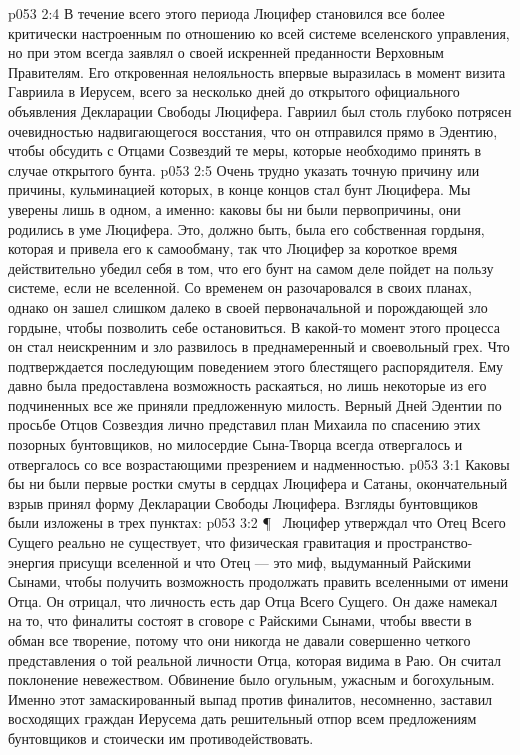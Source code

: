 \vs p053 2:4 В течение всего этого периода Люцифер становился все более критически настроенным по отношению ко всей системе вселенского управления, но при этом всегда заявлял о своей искренней преданности Верховным Правителям. Его откровенная нелояльность впервые выразилась в момент визита Гавриила в Иерусем, всего за несколько дней до открытого официального объявления Декларации Свободы Люцифера. Гавриил был столь глубоко потрясен очевидностью надвигающегося восстания, что он отправился прямо в Эдентию, чтобы обсудить с Отцами Созвездий те меры, которые необходимо принять в случае открытого бунта.
\vs p053 2:5 Очень трудно указать точную причину или причины, кульминацией которых, в конце концов стал бунт Люцифера. Мы уверены лишь в одном, а именно: каковы бы ни были первопричины, они родились в уме Люцифера. Это, должно быть, была его собственная гордыня, которая и привела его к самообману, так что Люцифер за короткое время действительно убедил себя в том, что его бунт на самом деле пойдет на пользу системе, если не вселенной. Со временем он разочаровался в своих планах, однако он зашел слишком далеко в своей первоначальной и порождающей зло гордыне, чтобы позволить себе остановиться. В какой\hyp{}то момент этого процесса он стал неискренним и зло развилось в преднамеренный и своевольный грех. Что подтверждается последующим поведением этого блестящего распорядителя. Ему давно была предоставлена возможность раскаяться, но лишь некоторые из его подчиненных все же приняли предложенную милость. Верный Дней Эдентии по просьбе Отцов Созвездия лично представил план Михаила по спасению этих позорных бунтовщиков, но милосердие Сына\hyp{}Творца всегда отвергалось и отвергалось со все возрастающими презрением и надменностью.
\vs p053 3:1 Каковы бы ни были первые ростки смуты в сердцах Люцифера и Сатаны, окончательный взрыв принял форму Декларации Свободы Люцифера. Взгляды бунтовщиков были изложены в трех пунктах:
\vs p053 3:2 \P\ \bibnobreakspace {} Люцифер утверждал что Отец Всего Сущего реально не существует, что физическая гравитация и пространство\hyp{}энергия присущи вселенной и что Отец --- это миф, выдуманный Райскими Сынами, чтобы получить возможность продолжать править вселенными от имени Отца. Он отрицал, что личность есть дар Отца Всего Сущего. Он даже намекал на то, что финалиты состоят в сговоре с Райскими Сынами, чтобы ввести в обман все творение, потому что они никогда не давали совершенно четкого представления о той реальной личности Отца, которая видима в Раю. Он считал поклонение невежеством. Обвинение было огульным, ужасным и богохульным. Именно этот замаскированный выпад против финалитов, несомненно, заставил восходящих граждан Иерусема дать решительный отпор всем предложениям бунтовщиков и стоически им противодействовать.

